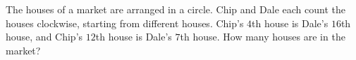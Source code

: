 The houses of a market are arranged in a circle. Chip and Dale each count the houses clockwise, starting from different houses. Chip's $4$th house is Dale's $16$th house, and Chip's $12$th house is Dale's $7$th house. How many houses are in the market?
